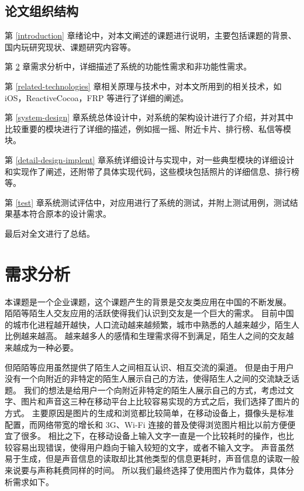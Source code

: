 \section{论文组织结构}

第 \ref{introduction} 章绪论中，对本文阐述的课题进行说明，主要包括课题的背景、国内玩研究现状、课题研究内容等。

第 \ref{demand} 章需求分析中，详细描述了系统的功能性需求和非功能性需求。

第 \ref{related-technologies} 章相关原理与技术中，对本文所用到的相关技术，如 iOS，ReactiveCocoa，FRP 等进行了详细的阐述。

第 \ref{system-design} 章系统总体设计中，对系统的架构设计进行了介绍，并对其中比较重要的模块进行了详细的描述，例如摇一摇、附近卡片、排行榜、私信等模块。

第 \ref{detail-design-implent} 章系统详细设计与实现中，对一些典型模块的详细设计和实现作了阐述，还附带了具体实现代码，这些模块包括照片的详细信息、排行榜等。

第 \ref{test} 章系统测试评估中，对应用进行了系统的测试，并附上测试用例，测试结果基本符合原本的设计需求。

最后对全文进行了总结。

\chapter{需求分析}
\label{demand}

本课题是一个企业课题，这个课题产生的背景是交友类应用在中国的不断发展。
陌陌等陌生人交友应用的活跃使得我们认识到交友是一个巨大的需求。
目前中国的城市化进程越开越快，人口流动越来越频繁，城市中熟悉的人越来越少，陌生人比例越来越高。
越来越多人的感情和生理需求得不到满足，陌生人之间的交友越来越成为一种必要。

但陌陌等应用虽然提供了陌生人之间相互认识、相互交流的渠道。
但是由于用户没有一个向附近的非特定的陌生人展示自己的方法，使得陌生人之间的交流缺乏话题。
我们的想法是给用户一个向附近非特定的陌生人展示自己的方式，考虑过文字、图片和声音这三种在移动平台上比较容易实现的方式之后，我们选择了图片的方式。
主要原因是图片的生成和浏览都比较简单，在移动设备上，摄像头是标准配置，而网络带宽的增长和 3G、Wi-Fi 连接的普及使得浏览图片相比以前方便便宜了很多。
相比之下，在移动设备上输入文字一直是一个比较耗时的操作，也比较容易出现错误，使得用户趋向于输入较短的文字，或者不输入文字。
声音虽然易于生成，但是声音信息的读取却比其他类型的信息更耗时，声音信息的读取一般来说要与声称耗费同样的时间。
所以我们最终选择了使用图片作为载体，具体分析需求如下。

